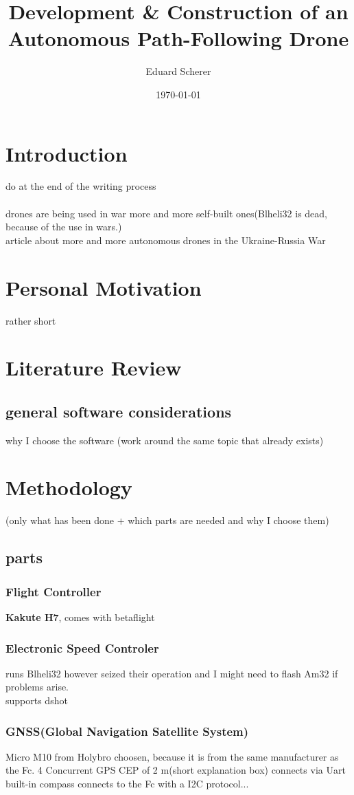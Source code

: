 \documentclass{article}
\author{Eduard Scherer}
\title{Development \& Construction of an Autonomous Path-Following Drone}
\date{\today}
\begin{document}
\maketitle
	\section{Introduction}
	do at the end of the writing process
	\\
	\\ drones are being used in war more and more self-built ones(Blheli32 is dead, because of the use in wars.)
	\\ article about more and more autonomous drones in the Ukraine-Russia War
	
	\section{Personal Motivation}
	rather short
	\section{Literature Review}
	\subsection{general software considerations}
	why I choose the software
	(work around the same topic that already exists)
	\section{Methodology}
	(only what has been done + which parts are needed and why I choose them)
	\subsection{parts}
	
	\subsubsection[Fc]{Flight Controller}
	\textbf{Kakute H7}, comes with betaflight
	\subsubsection[ESC]{Electronic Speed Controler}
	runs Blheli32 however seized their operation and I might need to flash Am32 if problems arise.
	\\supports dshot 
	
	
	
	\subsubsection{GNSS(Global Navigation Satellite System)}
	Micro M10 from Holybro choosen, because it is from the same manufacturer as the Fc.
	4 Concurrent GPS
	CEP of 2 m(short explanation box)
	connects via Uart
	\\ built-in compass connects to the Fc with a I2C protocol...
	
\end{document}
